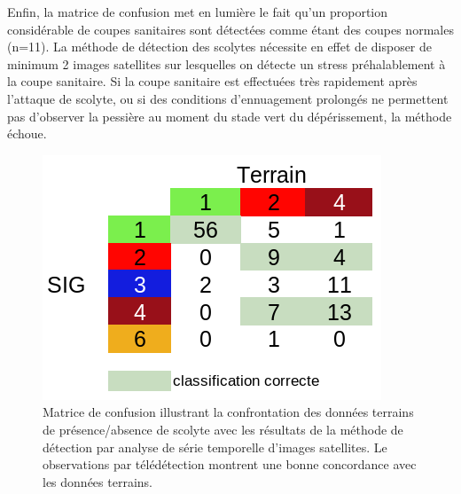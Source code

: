 \documentclass[a4paper, 12pt]{article} %
\begin{document}
Enfin, la matrice de confusion met en lumière le fait qu'un proportion considérable de coupes sanitaires sont détectées comme étant des coupes normales (n=11). La méthode de détection des scolytes nécessite en effet de disposer de minimum 2 images satellites sur lesquelles on détecte un stress préhalablement à la coupe sanitaire. Si la coupe sanitaire est effectuées très rapidement après l'attaque de scolyte, ou si des conditions d'ennuagement prolongés ne permettent pas d'observer la pessière au moment du stade vert du dépérissement, la méthode échoue.

\begin{figure}
	\centering
	\includegraphics[width=\linewidth]{confusionMat.png}
	\caption{Matrice de confusion illustrant la confrontation des données terrains de présence/absence de scolyte avec les résultats de la méthode de détection par analyse de série temporelle d'images satellites. Le observations par télédétection montrent une bonne concordance avec les données terrains.}
	\label{fig:tabConMat}
\end{figure}



\end{document}
